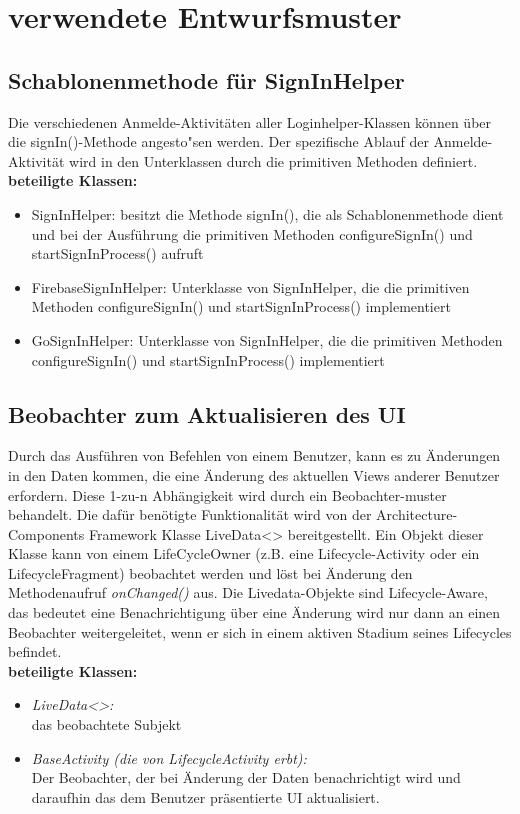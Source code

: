 \documentclass[parskip=full]{scrartcl}
\begin{document}
\newpage


\section{verwendete Entwurfsmuster}

\subsection{Schablonenmethode für SignInHelper}
Die verschiedenen Anmelde-Aktivitäten aller Loginhelper-Klassen können über die signIn()-Methode angesto"sen werden. Der spezifische Ablauf der Anmelde-Aktivität wird in den Unterklassen durch die primitiven Methoden definiert. \\

\textbf{beteiligte Klassen:}
\begin{itemize}
	\item SignInHelper: besitzt die Methode signIn(), die als Schablonenmethode dient und bei der Ausführung die primitiven Methoden configureSignIn() und startSignInProcess() aufruft
	\item FirebaseSignInHelper: Unterklasse von SignInHelper, die die primitiven Methoden configureSignIn() und startSignInProcess() implementiert
	\item GoSignInHelper: Unterklasse von SignInHelper, die die primitiven Methoden configureSignIn() und startSignInProcess() implementiert
\end{itemize}

\subsection{Beobachter zum Aktualisieren des UI}
Durch das Ausführen von Befehlen von einem Benutzer, kann es zu Änderungen in den Daten kommen, die eine Änderung des aktuellen Views anderer Benutzer erfordern. Diese 1-zu-n Abhängigkeit wird durch ein Beobachter-muster behandelt. Die dafür benötigte Funktionalität wird von der Architecture-Components Framework Klasse LiveData<> bereitgestellt. Ein Objekt dieser Klasse kann von einem LifeCycleOwner (z.B. eine Lifecycle-Activity oder ein LifecycleFragment) beobachtet werden und löst bei Änderung den Methodenaufruf \textit{onChanged()} aus. Die Livedata-Objekte sind Lifecycle-Aware, das bedeutet eine Benachrichtigung über eine Änderung wird nur dann an einen Beobachter weitergeleitet, wenn er sich in einem aktiven Stadium seines Lifecycles befindet.\\
\textbf{beteiligte Klassen:}
\begin{itemize}
	\item \textit{LiveData<>:}\\ das beobachtete Subjekt
	\item \textit{BaseActivity (die von LifecycleActivity erbt):}\\ Der Beobachter, der bei Änderung der Daten benachrichtigt wird und daraufhin das dem Benutzer präsentierte UI aktualisiert.
\end{itemize}
\end{document}
